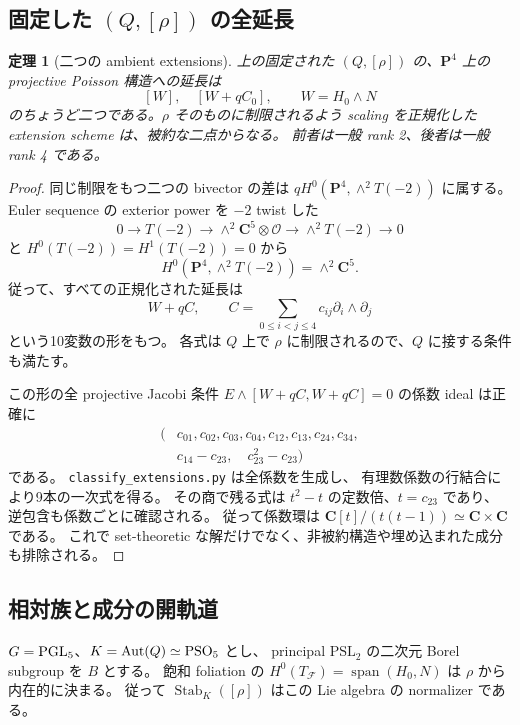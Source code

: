 \documentclass[11pt,a4paper]{ltjsarticle}
\newcommand{\PP}{\mathbf P}\renewcommand{\AA}{\mathbf A}\newcommand{\CC}{\mathbf C}\newcommand{\QQ}{\mathbf Q}
\newcommand{\OO}{\mathcal O}\newcommand{\FF}{\mathcal F}\newcommand{\cP}{\mathcal P}\newcommand{\dd}{\mathrm d}
\DeclareMathOperator{\Stab}{Stab}\DeclareMathOperator{\tr}{tr}\DeclareMathOperator{\Span}{span}
\newtheorem{theorem}{定理}[section]\newtheorem{proposition}[theorem]{命題}\newtheorem{lemma}[theorem]{補題}\newtheorem{corollary}[theorem]{系}
\theoremstyle{remark}\newtheorem{remark}[theorem]{注意}\renewcommand{\proofname}{証明}
\begin{document}
\subsection{固定した \texorpdfstring{$(Q,[\rho])$}{(Q,rho)} の全延長}
\begin{theorem}[二つの ambient extensions]\label{thm:two}
上の固定された $(Q,[\rho])$ の、$\PP^4$ 上の projective Poisson 構造への延長は
\[
 [W],\quad [W+qC_0],\qquad W=H_0\wedge N
\]
のちょうど二つである。$\rho$ そのものに制限されるよう scaling を正規化した
extension scheme は、被約な二点からなる。
前者は一般 rank 2、後者は一般 rank 4 である。
\end{theorem}
\begin{proof}
同じ制限をもつ二つの bivector の差は
$qH^0(\PP^4,\wedge^2T(-2))$ に属する。
Euler sequence の exterior power を $-2$ twist した
\[
 0\longrightarrow T(-2)\longrightarrow
 \wedge^2\CC^5\otimes\OO\longrightarrow
 \wedge^2T(-2)\longrightarrow0
\]
と $H^0(T(-2))=H^1(T(-2))=0$ から
\[
 H^0(\PP^4,\wedge^2T(-2))=\wedge^2\CC^5.
\]
従って、すべての正規化された延長は
\[
 W+qC,\qquad C=\sum_{0\le i<j\le4}c_{ij}\partial_i\wedge\partial_j
\]
という10変数の形をもつ。
各式は $Q$ 上で $\rho$ に制限されるので、$Q$ に接する条件も満たす。

この形の全 projective Jacobi 条件
$E\wedge[W+qC,W+qC]=0$ の係数 ideal は正確に
\begin{equation}\label{eq:extideal}
\begin{split}
 (&c_{01},c_{02},c_{03},c_{04},c_{12},c_{13},c_{24},c_{34},\\
  &c_{14}-c_{23},\quad c_{23}^2-c_{23})
\end{split}
\end{equation}
である。
\texttt{classify\_extensions.py} は全係数を生成し、
有理数係数の行結合により9本の一次式を得る。
その商で残る式は $t^2-t$ の定数倍、$t=c_{23}$ であり、
逆包含も係数ごとに確認される。
従って係数環は $\CC[t]/(t(t-1))\simeq\CC\times\CC$ である。
これで set-theoretic な解だけでなく、非被約構造や埋め込まれた成分も排除される。
\end{proof}

\subsection{相対族と成分の開軌道}
$G=\operatorname{PGL}_5$、$K=\operatorname{Aut}(Q)\simeq\mathrm{PSO}_5$ とし、
principal $\mathrm{PSL}_2$ の二次元 Borel subgroup を $B$ とする。
飽和 foliation の $H^0(T_\FF)=\Span(H_0,N)$ は $\rho$ から内在的に決まる。
従って $\Stab_K([\rho])$ はこの Lie algebra の normalizer である。
\end{document}
